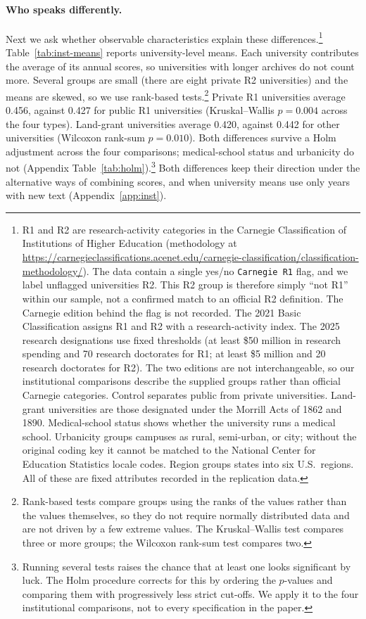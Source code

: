 \documentclass[11pt]{article}
\begin{document}
\paragraph{Who speaks differently.} Next we ask whether observable characteristics explain these differences.\footnote{R1 and R2 are research-activity categories in the Carnegie Classification of Institutions of Higher Education (methodology at \url{https://carnegieclassifications.acenet.edu/carnegie-classification/classification-methodology/}). The data contain a single yes/no \texttt{Carnegie R1} flag, and we label unflagged universities R2. This R2 group is therefore simply ``not R1'' within our sample, not a confirmed match to an official R2 definition. The Carnegie edition behind the flag is not recorded. The 2021 Basic Classification assigns R1 and R2 with a research-activity index. The 2025 research designations use fixed thresholds (at least \$50 million in research spending and 70 research doctorates for R1; at least \$5 million and 20 research doctorates for R2). The two editions are not interchangeable, so our institutional comparisons describe the supplied groups rather than official Carnegie categories. Control separates public from private universities. Land-grant universities are those designated under the Morrill Acts of 1862 and 1890. Medical-school status shows whether the university runs a medical school. Urbanicity groups campuses as rural, semi-urban, or city; without the original coding key it cannot be matched to the National Center for Education Statistics locale codes. Region groups states into six U.S.\ regions. All of these are fixed attributes recorded in the replication data.} Table~\ref{tab:inst-means} reports university-level means. Each university contributes the average of its annual scores, so universities with longer archives do not count more. Several groups are small (there are eight private R2 universities) and the means are skewed, so we use rank-based tests.\footnote{Rank-based tests compare groups using the ranks of the values rather than the values themselves, so they do not require normally distributed data and are not driven by a few extreme values. The Kruskal--Wallis test compares three or more groups; the Wilcoxon rank-sum test compares two.} Private R1 universities average 0.456, against 0.427 for public R1 universities (Kruskal--Wallis $p = 0.004$ across the four types). Land-grant universities average 0.420, against 0.442 for other universities (Wilcoxon rank-sum $p = 0.010$). Both differences survive a Holm adjustment across the four comparisons; medical-school status and urbanicity do not (Appendix Table~\ref{tab:holm}).\footnote{Running several tests raises the chance that at least one looks significant by luck. The Holm procedure corrects for this by ordering the $p$-values and comparing them with progressively less strict cut-offs. We apply it to the four institutional comparisons, not to every specification in the paper.} Both differences keep their direction under the alternative ways of combining scores, and when university means use only years with new text (Appendix~\ref{app:inst}).
\end{document}
